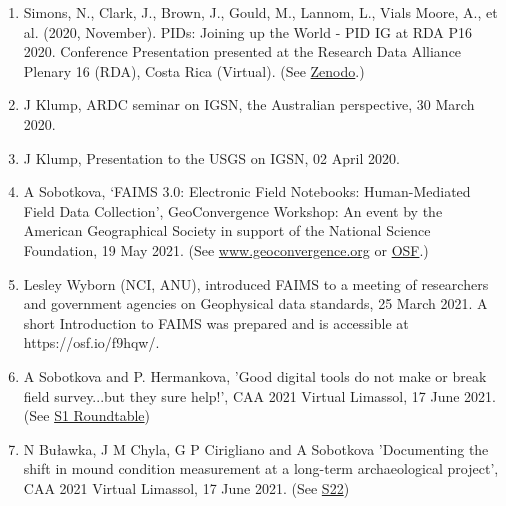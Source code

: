 \documentclass[
	aspectratio=169, %
	11pt, %
	t, %
]{beamer}
\begin{document}
\begin{frame}[allowframebreaks]
\begin{enumerate}
            \item Simons, N., Clark, J., Brown, J., Gould, M., Lannom, L., Vials Moore, A., et al. (2020, November). PIDs: Joining up the World - PID IG at RDA P16 2020. Conference Presentation presented at the Research Data Alliance Plenary 16 (RDA), Costa Rica (Virtual). (See \href{https://doi.org/10.5281/zenodo.4291878}{Zenodo}.)
            \item J Klump, ARDC seminar on IGSN, the Australian perspective, 30 March 2020.
            \item J Klump, Presentation to the USGS on IGSN, 02 April 2020.
            \item A Sobotkova, ‘FAIMS 3.0: Electronic Field Notebooks: Human-Mediated Field Data Collection’, GeoConvergence Workshop: An event by the American Geographical Society in support of the National Science Foundation, 19 May 2021. (See \href{https://www.geoconvergence.org/ltblog/sobotkova}{www.geoconvergence.org} or \href{https://osf.io/k7c5h/}{OSF}.)
            \item Lesley Wyborn (NCI, ANU), introduced FAIMS to a meeting of researchers and government agencies on Geophysical data standards, 25 March 2021. A short Introduction to FAIMS was prepared and is accessible at https://osf.io/f9hqw/. 
            \item A Sobotkova and P. Hermankova, 'Good digital tools do not make or break field survey...but they sure help!', CAA 2021 Virtual Limassol, 17 June 2021. (See \href{https://2021.caaconference.org/sessions/\#1}{S1 Roundtable}) 
            \item N Buławka, J M Chyla, G P Cirigliano and A Sobotkova 'Documenting the shift in mound condition measurement at a long-term archaeological project', CAA 2021 Virtual Limassol, 17 June 2021. (See  \href{https://2021.caaconference.org/sessions/\#22}{S22})

    \end{enumerate}

\end{frame}








\end{document}

